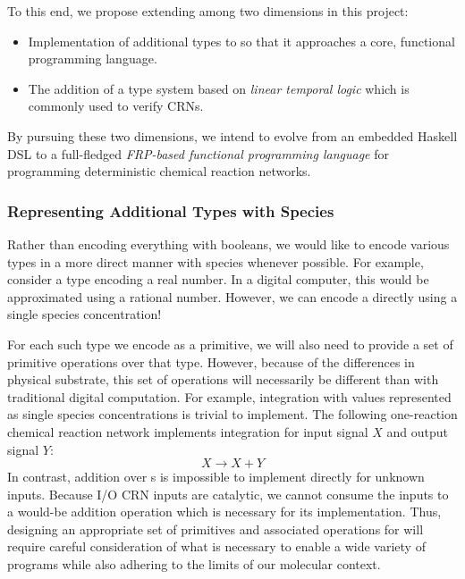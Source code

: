 To this end, we propose extending \reactamole{} among two dimensions in this project:
\begin{itemize}[itemsep=0pt]
  \item Implementation of additional types to \reactamole{} so that it approaches a core, functional programming language.
  \item The addition of a type system based on \emph{linear temporal logic} which is commonly used to verify CRNs.
\end{itemize}
By pursuing these two dimensions, we intend to evolve \reactamole from an embedded Haskell DSL to a full-fledged \emph{FRP-based functional programming language} for programming deterministic chemical reaction networks.

\subsubsection{Representing Additional Types with Species}

Rather than encoding everything with booleans, we would like to encode various types in a more direct manner with species whenever possible.
For example, consider a  type encoding a real number.
In a digital computer, this would be approximated using a rational number.
However, we can encode a  directly using a single species concentration!

For each such type we encode as a primitive, we will also need to provide a set of primitive operations over that type.
However, because of the differences in physical substrate, this set of operations will necessarily be different than with traditional digital computation.
For example, integration with  values represented as single species concentrations is trivial to implement.
The following one-reaction chemical reaction network implements integration for input signal \( X \) and output signal \( Y \):
\[
X → X + Y
\]
In contrast, addition over s is impossible to implement directly for unknown inputs.
Because I/O CRN inputs are catalytic, we cannot consume the inputs to a would-be addition operation which is necessary for its implementation.
Thus, designing an appropriate set of primitives and associated operations for \reactamole will require careful consideration of what is necessary to enable a wide variety of programs while also adhering to the limits of our molecular context.

